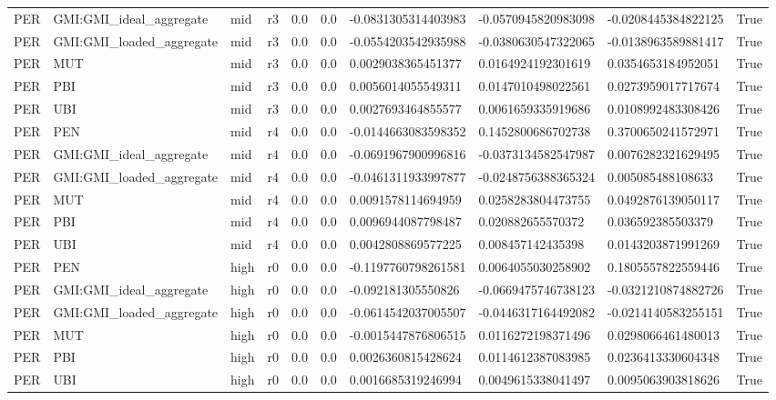 \begin{table}[!htbp]
\begin{tabular}{llllllllll}
PER & GMI:GMI\_ideal\_aggregate & mid & r3 & 0.0 & 0.0 & -0.0831305314403983 & -0.0570945820983098 & -0.0208445384822125 & True \\
PER & GMI:GMI\_loaded\_aggregate & mid & r3 & 0.0 & 0.0 & -0.0554203542935988 & -0.0380630547322065 & -0.0138963589881417 & True \\
PER & MUT & mid & r3 & 0.0 & 0.0 & 0.0029038365451377 & 0.0164924192301619 & 0.0354653184952051 & True \\
PER & PBI & mid & r3 & 0.0 & 0.0 & 0.0056014055549311 & 0.0147010498022561 & 0.0273959017717674 & True \\
PER & UBI & mid & r3 & 0.0 & 0.0 & 0.0027693464855577 & 0.0061659335919686 & 0.0108992483308426 & True \\
PER & PEN & mid & r4 & 0.0 & 0.0 & -0.0144663083598352 & 0.1452800686702738 & 0.3700650241572971 & True \\
PER & GMI:GMI\_ideal\_aggregate & mid & r4 & 0.0 & 0.0 & -0.0691967900996816 & -0.0373134582547987 & 0.0076282321629495 & True \\
PER & GMI:GMI\_loaded\_aggregate & mid & r4 & 0.0 & 0.0 & -0.0461311933997877 & -0.0248756388365324 & 0.005085488108633 & True \\
PER & MUT & mid & r4 & 0.0 & 0.0 & 0.0091578114694959 & 0.0258283804473755 & 0.0492876139050117 & True \\
PER & PBI & mid & r4 & 0.0 & 0.0 & 0.0096944087798487 & 0.020882655570372 & 0.036592385503379 & True \\
PER & UBI & mid & r4 & 0.0 & 0.0 & 0.0042808869577225 & 0.008457142435398 & 0.0143203871991269 & True \\
PER & PEN & high & r0 & 0.0 & 0.0 & -0.1197760798261581 & 0.0064055030258902 & 0.1805557822559446 & True \\
PER & GMI:GMI\_ideal\_aggregate & high & r0 & 0.0 & 0.0 & -0.092181305550826 & -0.0669475746738123 & -0.0321210874882726 & True \\
PER & GMI:GMI\_loaded\_aggregate & high & r0 & 0.0 & 0.0 & -0.0614542037005507 & -0.0446317164492082 & -0.0214140583255151 & True \\
PER & MUT & high & r0 & 0.0 & 0.0 & -0.0015447876806515 & 0.0116272198371496 & 0.0298066461480013 & True \\
PER & PBI & high & r0 & 0.0 & 0.0 & 0.0026360815428624 & 0.0114612387083985 & 0.0236413330604348 & True \\
PER & UBI & high & r0 & 0.0 & 0.0 & 0.0016685319246994 & 0.0049615338041497 & 0.0095063903818626 & True \\

\end{tabular}
\end{table}
